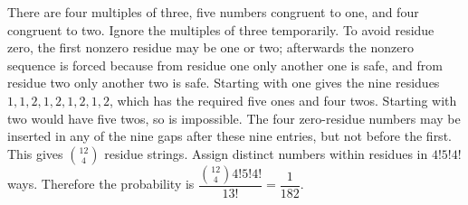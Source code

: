 There are four multiples of three, five numbers congruent to one, and four congruent to two. Ignore the multiples of three temporarily. To avoid residue zero, the first nonzero residue may be one or two; afterwards the nonzero sequence is forced because from residue one only another one is safe, and from residue two only another two is safe. Starting with one gives the nine residues $1,1,2,1,2,1,2,1,2$, which has the required five ones and four twos. Starting with two would have five twos, so is impossible. The four zero-residue numbers may be inserted in any of the nine gaps after these nine entries, but not before the first. This gives $\binom{12}{4}$ residue strings. Assign distinct numbers within residues in $4!5!4!$ ways. Therefore the probability is $\dfrac{\binom{12}{4}4!5!4!}{13!}=\boxed{\dfrac{1}{182}}$.
